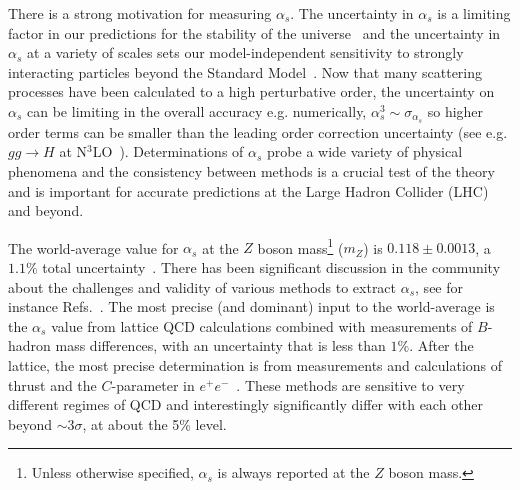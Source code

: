There is a strong motivation for measuring $\alpha_s$.  The uncertainty in $\alpha_s$ is a limiting factor in our predictions for the stability of the universe~\cite{Andreassen:2017rzq} and the uncertainty in $\alpha_s$ at a variety of scales sets our model-independent sensitivity to strongly interacting particles beyond the Standard Model~\cite{Kaplan:2008pt,Becciolini:2014lya}.   Now that many scattering processes have been calculated to a high perturbative order, the uncertainty on $\alpha_s$ can be limiting in the overall accuracy e.g. numerically, $\alpha_s^3\sim \sigma_{\alpha_s}$ so higher order terms can be smaller than the leading order correction uncertainty (see e.g. $gg\rightarrow H$ at N$^3$LO~\cite{Anastasiou:2015ema}).  Determinations of $\alpha_s$ probe a wide variety of physical phenomena and the consistency between methods is a crucial test of the theory and is important for accurate predictions at the Large Hadron Collider (LHC) and beyond.  



The world-average value for $\alpha_s$ at the $Z$ boson mass\footnote{Unless otherwise specified, $\alpha_s$ is always reported at the $Z$ boson mass. } ($m_Z$) is $0.118\pm 0.0013$, a $1.1\%$ total uncertainty~\cite{Olive:2016xmw}.  There has been significant discussion in the community about the challenges and validity of various methods to extract $\alpha_s$, see for instance Refs.~\cite{Bethke:2011tr,Pich:2013sqa,Moch:2014tta,dEnterria:2015kmd,Olive:2016xmw,Salam:2017qdl,Altarelli:2013bpa}.  The most precise (and dominant) input to the world-average is the $\alpha_s$ value from lattice QCD calculations combined with measurements of $B$-hadron mass differences, with an uncertainty that is less than $1\%$.   After the lattice, the most precise determination is from measurements and calculations of thrust and the $C$-parameter in $e^+e^-$~\cite{Abbate:2010xh,Hoang:2015hka,Heister:2003aj,Abdallah:2004xe,Abreu:1996mk,Abreu:1999rc,Biebel:1999zt,Adeva:1992gv,Abbiendi:2004qz,Abe:1994mf}.   These methods are sensitive to very different regimes of QCD and interestingly significantly differ with each other beyond $\sim 3\sigma$, at about the 5\% level.  



